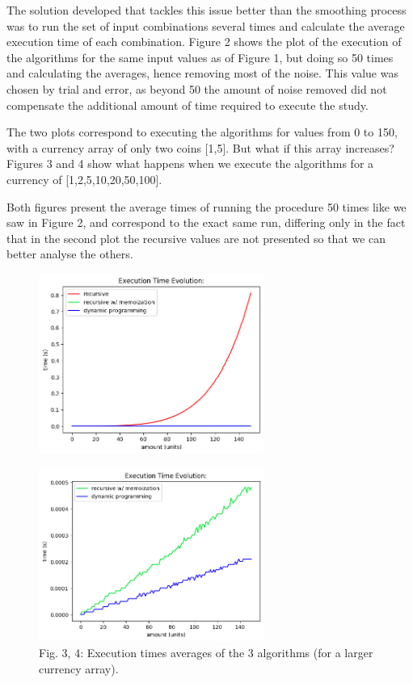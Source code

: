 \documentclass[shortpaper]{revdetua}
\begin{document}
The solution developed that tackles this issue better than the smoothing process
was to run the set of input combinations several times and calculate the average
execution time of each combination.
Figure 2 shows the plot of the execution of the algorithms for the 
same input values as of Figure 1, but doing so 50 times and 
calculating the averages, hence removing most of the noise. This value was 
chosen by trial and error, as beyond 50 the amount of noise removed did not 
compensate the additional amount of time required to execute the study.

The two plots correspond to executing the algorithms for values from 0 to 150,
with a currency array of only two coins [1,5]. 
But what if this array increases?
Figures 3 and 4 show what happens when we execute the
algorithms for a currency of [1,2,5,10,20,50,100].

Both figures present the average times of running the procedure 50 times like we
saw in Figure 2, and correspond to the exact same run, differing only 
in the fact that in the second plot the recursive values are not presented so 
that we can better analyse the others.

\begin{figure}[H]
    \centering
    \setlength{\belowcaptionskip}{-10pt}
    \includegraphics[width=2.9in]{../results/elaborate/tCMP_elaborate_results_plot_[125102050100].png}
    \caption{}
    \label{fig:3}
\end{figure}
\vspace{-25pt}
\begin{figure}[H]
    \centering
    \setlength{\belowcaptionskip}{-10pt}
    \includegraphics[width=2.9in]{../results/elaborate/tCMP_elaborate_results_plot_[125102050100]_memory.png}
    \caption{Fig. 3, 4: Execution times averages of the 3 algorithms (for a larger currency array).}
    \label{fig:4}
\end{figure}
\end{document}
